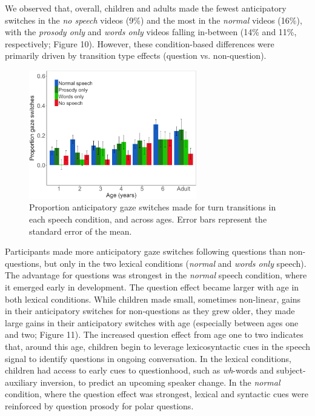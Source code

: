 \documentclass[authoryear, 12pt]{elsarticle}
\begin{document}
We observed that, overall, children and adults made the fewest anticipatory switches in the \textit{no speech} videos (9\%) and the most in the \textit{normal} videos (16\%), with the \textit{prosody only} and \textit{words only} videos falling in-between (14\% and 11\%, respectively; Figure 10). However, these condition-based differences were primarily driven by transition type effects (question vs. non-question).

\begin{figure}[H]
\begin{center}
\includegraphics[width=0.65\textwidth]{figures/FIG-conditions-EN.png}
\end{center}
\caption{Proportion anticipatory gaze switches made for turn transitions in each speech condition, and across ages. Error bars represent the standard error of the mean.} 
\label{conditionsEN}
\end{figure}

Participants made more anticipatory gaze switches following questions than non-questions, but only in the two lexical conditions (\textit{normal} and \textit{words only} speech). The advantage for questions was strongest in the \textit{normal} speech condition, where it emerged early in development. The question effect became larger with age in both lexical conditions. While children made small, sometimes non-linear, gains in their anticipatory switches for non-questions as they grew older, they made large gains in their anticipatory switches with age (especially between ages one and two; Figure 11). The increased question effect from age one to two indicates that, around this age, children begin to leverage lexicosyntactic cues in the speech signal to identify questions in ongoing conversation. In the lexical conditions, children had access to early cues to questionhood, such as \textit{wh}-words and subject-auxiliary inversion, to predict an upcoming speaker change. In the \textit{normal} condition, where the question effect was strongest, lexical and syntactic cues were reinforced by question prosody for polar questions.
\end{document}
